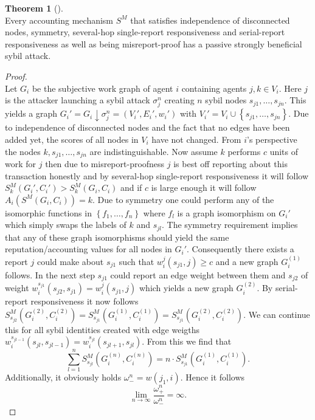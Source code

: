 \documentclass[11pt,a4paper]{article}
\theoremstyle{definition}
\theoremstyle{theorem}
\newtheorem{theorem}{Theorem}[section]
\theoremstyle{proposition}
\theoremstyle{corollary}
\theoremstyle{lemma}
\theoremstyle{example}
\theoremstyle{remark}
\begin{document}
\begin{theorem}[]\ \\
Every accounting mechanism $S^M$ that satisfies independence of disconnected nodes, symmetry, several-hop single-report responsiveness and serial-report responsiveness as well as being misreport-proof has a passive strongly beneficial sybil attack. 
\end{theorem}
\begin{proof}\ \\
Let $G_i$ be the subjective work graph of agent $i$ containing agents $j,k\in{}V_i$. Here $j$ is the attacker launching a sybil attack $\sigma_j^n$ creating $n$ sybil nodes $s_{j1},\ldots,s_{jn}$. This yields a graph $G_i'=G_i\downarrow\sigma_j^n=(V_i',E_i',w_i')$ with $V_i'=V_i\cup\left\lbrace{}s_{j1},\ldots,s_{jn}\right\rbrace$. Due to independence of disconnected nodes and the fact that no edges have been added yet, the scores of all nodes in $V_i$ have not changed. From $i$'s perspective the nodes $k,s_{j1},\ldots,s_{jn}$ are indistinguishable. Now assume $k$ performs $c$ units of work for $j$ then due to misreport-proofness $j$ is best off reporting about this transaction honestly and by several-hop single-report responsiveness it will follow $S_k^M(G_i',C_i')>S_k^M(G_i,C_i)$ and if $c$ is large enough it will follow $A_i(S^M(G_i,C_i))=k$. Due to symmetry one could perform any of the isomorphic functions in $\left\lbrace{}f_1,\ldots,f_n\right\rbrace$ where $f_l$ is a graph isomorphism on $G_i'$ which simply swaps the labels of $k$ and $s_{jl}$. The symmetry requirement implies that any of these graph isomorphisms should yield the same reputation/accounting values for all nodes in $G_i'$. Consequently there exists a report $j$ could make about $s_{j1}$ such that $w_i^j(s_{j1},j)\geq{}c$ and a new graph $G_i^{(1)}$ follows. In the next step $s_{j1}$ could report an edge weight between them and $s_{j2}$ of weight $w_i^{s_{j1}}(s_{j2},s_{j1})=w_i^j(s_{j1},j)$ which yields a new graph $G_i^{(2)}$. By serial-report responsiveness it now follows $S^M_{s_{j2}}(G_i^{(2)},C_i^{(2)}) = S^M_{s_{j1}}(G_i^{(1)},C_i^{(1)}) = S^M_{s_{j1}}(G_i^{(2)},C_i^{(2)})$. We can continue this for all sybil identities created with edge weigths $w_i^{s_{jl-1}}(s_{jl},s_{jl-1})=w_i^{s_{jl}}(s_{jl+1},s_{jl})$. From this we find that 
\[
\sum\limits_{l=1}^{n}S^M_{s_{jl}}(G_i^{(n)},C_i^{(n)}) = n\cdot{}S^M_{s_{j1}}(G_i^{(1)},C_i^{(1)}).
\]
Additionally, it obviously holds $\omega_{-}^n = w(j_1,i)$. Hence it follows
\[
\lim\limits_{n\rightarrow\infty}\frac{\omega_{+}^n}{\omega_{-}^n}=\infty.
\] 
\end{proof}
\end{document}
